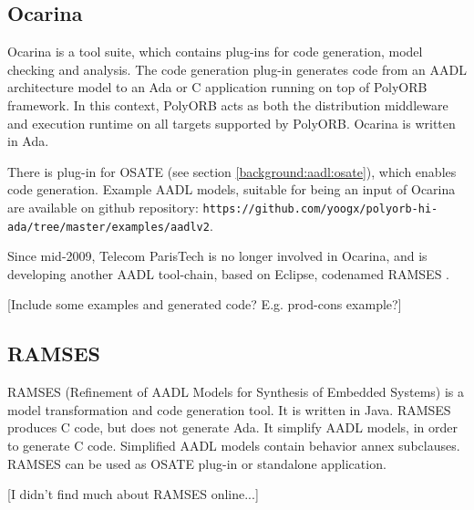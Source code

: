 \subsection{Ocarina}
\label{background:codegen:ocarina}

Ocarina \cite{Ocarina:Paper} is a tool suite, which contains plug-ins for code generation, model checking and analysis. The code generation plug-in generates code from an AADL architecture model to an Ada or C application running on top of PolyORB framework. In this context, PolyORB acts as both the distribution middleware and execution runtime on all targets supported by PolyORB. Ocarina is written in Ada.

There is plug-in for OSATE (see section \ref{background:aadl:osate}), which enables code generation. Example AADL models, suitable for being an input of Ocarina are available on github repository: \lstinline{https://github.com/yoogx/polyorb-hi-ada/tree/master/examples/aadlv2}.

Since mid-2009, Telecom ParisTech is no longer involved in Ocarina, and is developing another AADL tool-chain, based on Eclipse, codenamed RAMSES \cite{Ocarina:About:Online}.

[Include some examples and generated code? E.g. prod-cons example?]

\subsection{RAMSES}
\label{background:codegen:ramses}

RAMSES (Refinement of AADL Models for Synthesis of Embedded Systems) is a model transformation and code generation tool. It is written in Java. RAMSES produces C code, but does not generate Ada. It simplify AADL models, in order to generate C code. Simplified AADL models contain behavior annex subclauses. RAMSES can be used as OSATE plug-in or standalone application.

[I didn't find much about RAMSES online...]

